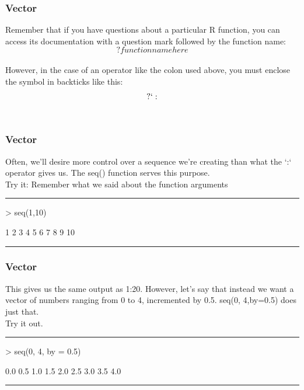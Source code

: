 \documentclass{beamer}
\begin{document}
\begin{frame}[fragile]
	\frametitle{Vector}
  	Remember that if you have questions about a particular R function, you can access its documentation with a question mark followed by the function name:\\
\begin{equation}?function name here \end{equation}\\
  However, in the case of an operator like the colon used above, you must enclose the symbol in backticks like this:\\
  \begin{equation}?`: \end{equation}\\
\end{frame}

\begin{frame}[fragile]
	\frametitle{Vector}
	Often, we'll desire more control over a sequence we're creating than what the `:` operator gives us. The seq() function serves this purpose.\\
	\centering Try it: \small Remember what we said about the function arguments\\
	\pause
	\rule{\textwidth}{0.4pt}
\begin{Schunk}
\begin{Sinput}
> seq(1,10)
\end{Sinput}
\begin{Soutput}
 [1]  1  2  3  4  5  6  7  8  9 10
\end{Soutput}
\end{Schunk}
	\rule{\textwidth}{0.4pt}
\end{frame}

\begin{frame}[fragile]
	\frametitle{Vector}
	This gives us the same output as 1:20. However, let's say that instead we want a vector of numbers ranging from 0 to 4, incremented by 0.5. seq(0, 4,by=0.5) does just that.\\
	\centering Try it out.\\
	\pause
	\rule{\textwidth}{0.4pt}
\begin{Schunk}
\begin{Sinput}
> seq(0, 4, by = 0.5)
\end{Sinput}
\begin{Soutput}
[1] 0.0 0.5 1.0 1.5 2.0 2.5 3.0 3.5 4.0
\end{Soutput}
\end{Schunk}
\rule{\textwidth}{0.4pt}
\end{frame}
\end{document}
